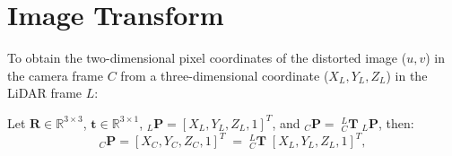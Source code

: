 \documentclass{erauthesis}
\begin{document}
% 

% 

% 




% 


\backmatter


\chapter{Image Transform} \label{img_tform}
% 

To obtain the two-dimensional pixel coordinates of the distorted image ($u, v$) in the camera frame $C$ from a three-dimensional coordinate ($X_{L}, Y_L, Z_L$) in the LiDAR frame $L$:

Let $\mathbf{R}\in \mathbb{R}^{3\times3}$, $\mathbf{t}\in \mathbb{R}^{3\times1}$, $_L\mathbf{P} = [X_L, Y_L, Z_L, 1]^T$,  and $_C\mathbf{P} = \;_{C}^{L}\mathbf{T} \; _L\mathbf{P}$, then:
\begin{equation*}
_C\mathbf{P} = [X_C, Y_C, Z_C, 1]^T \;= \; _{C}^{L}\mathbf{T} \;[X_L, Y_L, Z_L, 1]^T,
\end{equation*}
\end{document}
